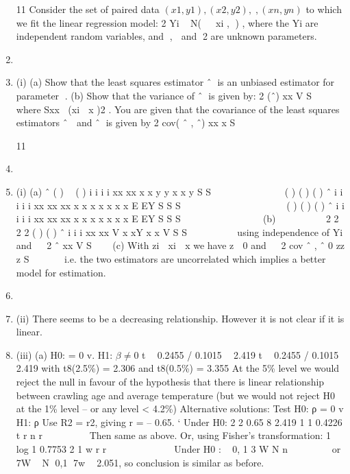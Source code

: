 \documentclass[a4paper,12pt]{article}
\begin{document}
\begin{enumerate}

11 Consider the set of paired data $(x1, y1), (x2 , y2 ),,(xn , yn )$ to which we fit the linear
regression model:
  2
Yi ~ N(  xi , ) ,
where the Yi are independent random variables, and ,  and 2 are unknown
parameters.
\item \item (i) (a) Show that the least squares estimator ˆ is an unbiased estimator for
parameter .
(b) Show that the variance of ˆ is given by:
  2
(ˆ)
xx
V
S

 
where Sxx (xi  x )2 .
You are given that the covariance of the least squares estimators ˆ  and ˆ is
given by
2
cov( ˆ , ˆ)
xx
x
S

11 \item \item (i) (a)
ˆ ( )  ( )
i i i i
xx xx
x x y y x x y
S S
  
    
    ( ) ( ) ( )
ˆ i i i i
i
xx xx xx
x x x x x x x
E EY
S S S
  
         
    ( ) ( ) ( )
ˆ i i i i
i
xx xx xx
x x x x x x x
E EY
S S S
  
         
(b)    
   
2 2
2 2
( ) ( )
ˆ i i i
xx xx
V x xY x x
V
S S
  
     using independence of Yi
and   2
ˆ
xx
V
S

 
(c) With zi  xi  x we have z  0 and   2
cov ˆ , ˆ 0
zz
z
S

   
i.e. the two estimators are uncorrelated which implies a better model for estimation.
\item \item (ii) There seems to be a decreasing relationship. However it is not clear if it is linear.
\item (iii) (a) H0: \beta = 0 v. H1: $\beta \neq 0$
t  0.2455 / 0.1015  2.419 t  0.2455 / 0.1015  2.419
with t8(2.5\%) = 2.306 and t8(0.5\%) = 3.355
At the 5\% level we would reject the null in favour of the hypothesis that there is linear relationship between crawling age and average
temperature (but we would not reject H0 at the 1\% level – or any
             level < 4.2\%)
Alternative solutions:
  Test H0: ρ = 0 v H1: ρ 
Use R2 = r2, giving r = – 0.65.
` Under H0:
  2
2 0.65 8 2.419
1 1 0.4226
t r n
r
 
  
 
Then same as above.
Or, using Fisher’s transformation:
  1 log 1 0.7753
2 1
w r
r
          
Under H0 :
  ~ 0, 1
3
W N
n
 
    
or 7W ~ N 0,1
7w  2.051, so conclusion is similar as before.

\end{enumerate}
\end{document}
